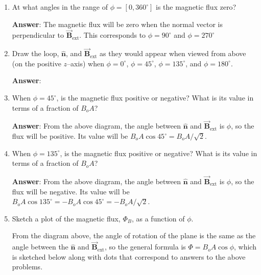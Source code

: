 \documentclass{article}
\newcommand{\bfvec}[1]{\vec{\mathbf{#1}}}
\begin{document}
\begin{enumerate}

  \item At what angles in the range of $\phi=[0,360^\circ]$ is the magnetic flux zero?

        \ifsolutions
        {\bf Answer}: The magnetic flux will be zero when the normal vector is perpendicular to  $\bfvec{B}_{\text{ext}}$. This corresponds to $\phi = 90^\circ$ and $\phi = 270^\circ$
        \else
        \vskip 36pt
        \fi

  \item Draw the loop, $\hat{\mathbf{n}}$, and $\bfvec{B}_{\text{ext}}$ as they would appear when viewed from above (on the positive $z$--axis) when $\phi=0^\circ$, $\phi=45^\circ$, $\phi=135^\circ$, and $\phi=180^\circ$.

        \ifsolutions
        \textbf{Answer}:

        
        \else
        \vskip 144pt
        \fi

  \item When $\phi=45^\circ$, is the magnetic flux positive or negative? What is its value in terms of a fraction of $B_oA$?

        \ifsolutions
        \textbf{Answer}: From the above diagram, the angle between $\hat{\mathbf{n}}$ and $\bfvec{B}_{\text{ext}}$ is $\phi$, so the flux will be positive. Its value will be $B_oA\cos 45^\circ=B_oA/\sqrt{2}$.
        \else
        \vskip 36pt
        \fi

  \item When $\phi=135^\circ$, is the magnetic flux positive or negative? What is its value in terms of a fraction of $B_oA$?

        \ifsolutions
        \textbf{Answer}: From the above diagram, the angle between $\hat{\mathbf{n}}$ and $\bfvec{B}_{\text{ext}}$ is $\phi$, so the flux will be negative. Its value will be $B_oA\cos 135^\circ=-B_oA\cos 45^\circ=-B_oA/\sqrt{2}$.
        \else
        \vskip 36pt
        \fi

  \item Sketch a plot of the magnetic flux, $\Phi_B$, as a function of $\phi$.

        \ifsolutions
        From the diagram above, the angle of rotation of the plane is the same as the angle between the  $\hat{\mathbf{n}}$ and $\bfvec{B}_{\text{ext}}$, so the general formula is $\Phi=B_oA\cos\phi$, which is sketched below along with dots that correspond to answers to the above problems.

        
        \else
        \vskip 60pt
        \fi

\end{enumerate}
\end{document}
